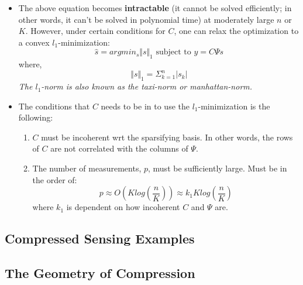 \documentclass[11.5pt,a4paper]{article}
\begin{document}
\begin{itemize}
\begin{itemize}
        \item The above equation becomes \textbf{intractable} (it cannot be solved efficiently; in other words, it can't be solved in polynomial time) at moderately large $n$ or $K$. However, under certain conditions for $C$, one can relax the optimization to a convex $l_1$-minimization:
        \begin{equation*}
            \hat s = argmin_s \Vert s \Vert_1 \text{    subject to  } y= C\Psi s
        \end{equation*}
        where,
        \begin{equation*}
            \Vert s \Vert_1 = \Sigma^n_{k=1} |s_k|
        \end{equation*}
        \textit{The $l_1$-norm is also known as the taxi-norm or manhattan-norm.}
        \item The conditions that $C$ needs to be in to use the $l_1$-minimization is the following:
        \begin{enumerate}
            \item $C$ must be incoherent wrt the sparsifying basis. In other words, the rows of $C$ are not correlated with the columns of $\Psi$.
            \item The number of measurements, $p$, must be sufficiently large. Must be in the order of:
            \begin{equation*}
                p \approx O\left(Klog\left(\frac{n}{K}\right)\right)\approx k_1Klog\left(\frac{n}{K}\right)
            \end{equation*}
            where $k_1$ is dependent on how incoherent $C$ and $\Psi$ are.
        \end{enumerate}
    \end{itemize}
\end{itemize}

\subsection*{Compressed Sensing Examples}


\subsection*{The Geometry of Compression}
\end{document}
